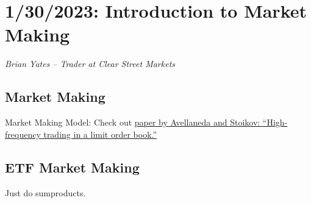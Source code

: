 \chapter{1/30/2023: Introduction to Market Making}
\textit{Brian Yates -- Trader at Clear Street Markets}

\section{Market Making}
Market Making Model: Check out \href{https://www.math.nyu.edu/~avellane/HighFrequencyTrading.pdf}{paper by Avellaneda and Stoikov: ``High-frequency trading in a limit order book.''}

\section{ETF Market Making}
Just do sumproducts.

